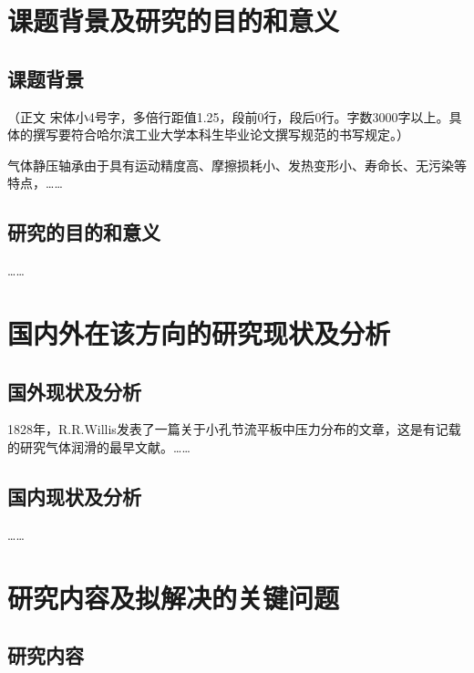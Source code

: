
\section{课题背景及研究的目的和意义}

\subsection{课题背景}

（正文  宋体小4号字，多倍行距值1.25，段前0行，段后0行。字数3000字以上。具体的撰写要符合哈尔滨工业大学本科生毕业论文撰写规范的书写规定。）

气体静压轴承由于具有运动精度高、摩擦损耗小、发热变形小、寿命长、无污染等特点，……

\subsection{研究的目的和意义}

……

\section{国内外在该方向的研究现状及分析}

\subsection{国外现状及分析}

1828年，R.R.Willis\cite{zhao1998}发表了一篇关于小孔节流平板中压力分布的文章，这是有记载的研究气体润滑的最早文献。……

\subsection{国内现状及分析}

……

\section{研究内容及拟解决的关键问题}

\subsection{研究内容}

